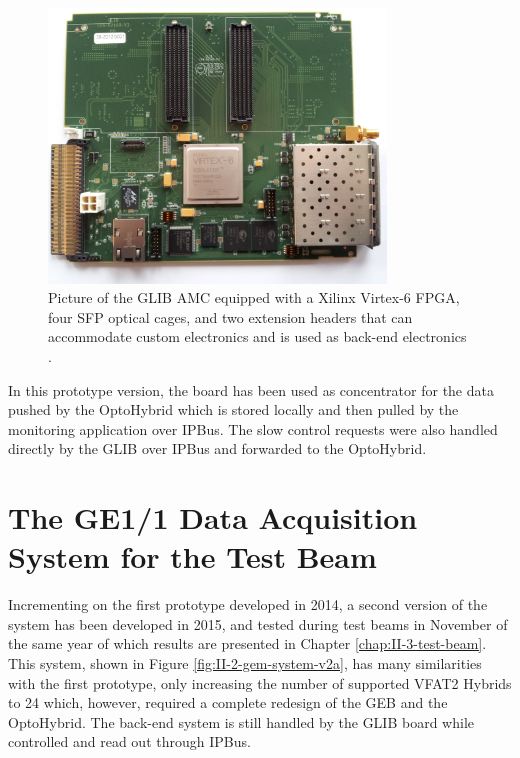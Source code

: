       \begin{figure}[h!]
        \centering
        \includegraphics[width=0.8\textwidth]{img/II-2-daq/glib.jpg}
        \caption{Picture of the GLIB AMC equipped with a Xilinx Virtex-6 FPGA, four SFP optical cages, and two extension headers that can accommodate custom electronics and is used as back-end electronics \cite{Vichoudis:1359270}.}
        \label{fig:II-2-glib}
      \end{figure}

       In this prototype version, the board has been used as concentrator for the data pushed by the OptoHybrid which is stored locally and then pulled by the monitoring application over IPBus. The slow control requests were also handled directly by the GLIB over IPBus and forwarded to the OptoHybrid.

  \section{The GE1/1 Data Acquisition System for the Test Beam}

    Incrementing on the first prototype developed in 2014, a second version of the system has been developed in 2015, and tested during test beams in November of the same year of which results are presented in Chapter \ref{chap:II-3-test-beam}. This system, shown in Figure \ref{fig:II-2-gem-system-v2a}, has many similarities with the first prototype, only increasing the number of supported VFAT2 Hybrids to 24 which, however, required a complete redesign of the GEB and the OptoHybrid. The back-end system is still handled by the GLIB board while controlled and read out through IPBus.

